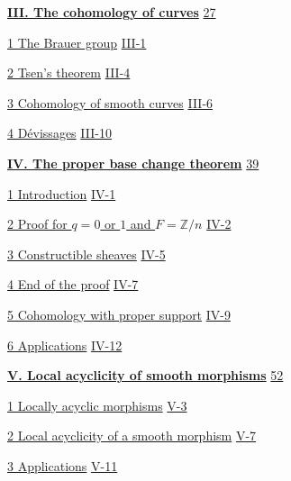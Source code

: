 \hyperref[I:3]{\textbf{III. The cohomology of curves}}\dotfill
  \hyperref[I:3]{27}\par
\hspace*{1.5em}\hyperref[I:3-1]{1 The Brauer group}\dotfill
  \hyperref[I:3-1]{III-1}\par
\hspace*{1.5em}\hyperref[I:3-2]{2 Tsen’s theorem}\dotfill
  \hyperref[I:3-2]{III-4}\par
\hspace*{1.5em}\hyperref[I:3-3]{3 Cohomology of smooth curves}\dotfill
  \hyperref[I:3-3]{III-6}\par
\hspace*{1.5em}\hyperref[I:3-4]{4 Dévissages}\dotfill
  \hyperref[I:3-4]{III-10}\par

\hyperref[I:4]{\textbf{IV. The proper base change theorem}}\dotfill
  \hyperref[I:4]{39}\par
\hspace*{1.5em}\hyperref[I:4-1]{1 Introduction}\dotfill
  \hyperref[I:4-1]{IV-1}\par
\hspace*{1.5em}\hyperref[I:4-2]{2 Proof for $q=0$ or $1$ and $F=\mathbb Z/n$}\dotfill
  \hyperref[I:4-2]{IV-2}\par
\hspace*{1.5em}\hyperref[I:4-3]{3 Constructible sheaves}\dotfill
  \hyperref[I:4-3]{IV-5}\par
\hspace*{1.5em}\hyperref[I:4-4]{4 End of the proof}\dotfill
  \hyperref[I:4-4]{IV-7}\par
\hspace*{1.5em}\hyperref[I:4-5]{5 Cohomology with proper support}\dotfill
  \hyperref[I:4-5]{IV-9}\par
\hspace*{1.5em}\hyperref[I:4-6]{6 Applications}\dotfill
  \hyperref[I:4-6]{IV-12}\par

\hyperref[I:5]{\textbf{V. Local acyclicity of smooth morphisms}}\dotfill
  \hyperref[I:5]{52}\par
\hspace*{1.5em}\hyperref[I:5-1]{1 Locally acyclic morphisms}\dotfill
  \hyperref[I:5-1]{V-3}\par
\hspace*{1.5em}\hyperref[I:5-2]{2 Local acyclicity of a smooth morphism}\dotfill
  \hyperref[I:5-2]{V-7}\par
\hspace*{1.5em}\hyperref[I:5-3]{3 Applications}\dotfill
  \hyperref[I:5-3]{V-11}\par

